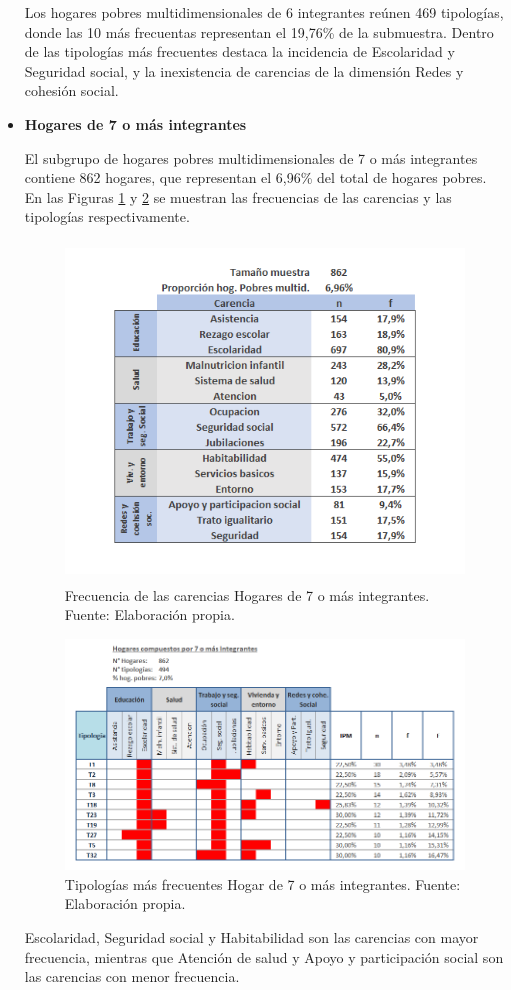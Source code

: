 \documentclass[12pt,letterpaper,spanish]{article}
\begin{document}
\begin{itemize}
    Los hogares pobres multidimensionales de 6 integrantes reúnen 469 tipologías, donde las 10 más frecuentas representan el 19,76\% de la submuestra. Dentro de las tipologías más frecuentes destaca la incidencia de Escolaridad y Seguridad social, y la inexistencia de carencias de la dimensión Redes y cohesión social.

    \item \textbf{Hogares de 7 o más integrantes}
    
    El subgrupo de hogares pobres multidimensionales de 7 o más integrantes contiene 862 hogares, que representan el 6,96\% del total de hogares pobres. En las Figuras \ref{fren7} y \ref{tipn7} se muestran las frecuencias de las carencias y las tipologías respectivamente.
    
    \begin{figure}[H]
        \centering
        \includegraphics[height=9cm]{HOGARES/tabla_num7.png}
        \caption{Frecuencia de las carencias Hogares de 7 o más integrantes. Fuente: Elaboración propia.}
        \label{fren7}
    \end{figure}
    \begin{figure}[H]
        \centering
        \includegraphics[width=\textwidth]{Mati N/n=7+.png}
        \caption{Tipologías más frecuentes Hogar de 7 o más integrantes. Fuente: Elaboración propia.}
        \label{tipn7}
    \end{figure}
    Escolaridad, Seguridad social y Habitabilidad son las carencias con mayor frecuencia, mientras que Atención de salud y Apoyo y participación social son las carencias con menor frecuencia.
    

\end{itemize}
\end{document}

